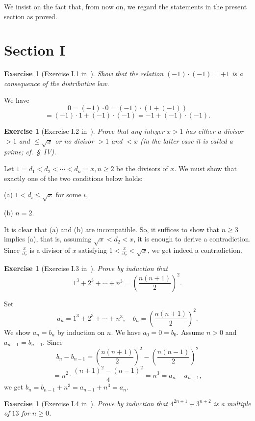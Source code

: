 \documentclass[12pt,letterpaper]{article}
\newtheorem{exer}[thm]{Exercise}
\theoremstyle{definition}
\begin{document}
We insist on the fact that, from now on, we regard the statements in the present section as proved. 

\section{Section I} %

\begin{exer}[Exercise I.1 in~\cite{weil1979}] 
Show that the relation $(-1)\cdot(-1) = +1$ is a consequence of the distributive law.
\end{exer} 

We have 
$$
0=(-1)\cdot0 = (-1)\cdot(1+(-1)) 
$$ 
$$
= (-1)\cdot1+(-1)\cdot(-1) = -1+(-1)\cdot(-1).
$$ 

\begin{exer}[Exercise I.2 in~\cite{weil1979}] 
Prove that any integer $x>1$ has either a divisor $>1$ and $\le \sqrt{x}$ or no divisor $>1$ and $<x$ (in the latter case it is called a prime; cf.~\S~IV).
\end{exer} 

Let $1=d_1<d_2<\cdots<d_n=x, n\ge2$ be the divisors of $x$. We must show that exactly one of the two conditions below holds: 

(a) $1<d_i\le\sqrt{x}$ for some $i$, 

(b) $n=2$. 

\noindent It is clear that (a) and (b) are incompatible. So, it suffices to show that $n\ge3$ implies (a), that is, assuming $\sqrt{x}<d_2<x$, it is enough to derive a contradiction. Since $\frac{x}{d_2}$ is a divisor of $x$ satisfying $1<\frac{x}{d_2}<\sqrt{x}$, we get indeed a contradiction. 

\begin{exer}[Exercise I.3 in~\cite{weil1979}] 
Prove by induction that
\[
1^3+2^3+\cdots+n^3 = \left(\frac{n(n+1)}{2}\right)^2.
\]
\end{exer}

Set 
$$
a_n=1^3+2^3+\cdots+n^3,\quad b_n=\left(\frac{n(n+1)}{2}\right)^2.
$$ 
We show $a_n=b_n$ by induction on $n$. We have $a_0=0=b_0$. Assume $n>0$ and $a_{n-1}=b_{n-1}$. Since 
$$
b_n - b_{n-1} = \left(\frac{n(n+1)}{2}\right)^2 - \left(\frac{n(n-1)}{2}\right)^2
$$ 
$$
= n^2\cdot \frac{(n+1)^2-(n-1)^2}{4} = n^3 = a_n - a_{n-1},
$$ 
we get $b_n = b_{n-1} + n^3 = a_{n-1} + n^3 = a_n$. 

\begin{exer}[Exercise I.4 in~\cite{weil1979}] 
Prove by induction that $4^{2n+1}+3^{n+2}$ is a multiple of $13$ for $n \ge 0$.
\end{exer} 
\end{document}
